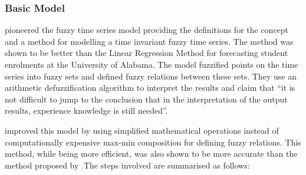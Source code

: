 \documentclass[12pt, oneside, a4paper]{article}
\theoremstyle{definition}
\begin{document}
\subsubsection{Basic Model}
\label{basic}
\cite{song1993forecasting} pioneered the fuzzy time series model providing the definitions for the concept and a method for modelling a time invariant fuzzy time series. The method was shown to be better than the Linear Regression Method for forecasting student enrolments at the University of Alabama. The model fuzzified points on the time series into fuzzy sets and defined fuzzy relations between these sets. They use an arithmetic defuzzification algorithm to interpret the results and claim that ``it is not difficult to jump to the conclusion that in the interpretation of the output results, experience knowledge is still needed''.
 
\cite{chen1996forecasting} improved this model by using simplified mathematical operations instead of computationally expensive max-min composition for defining fuzzy relations. This method, while being more efficient, was also shown to be more accurate than the method proposed by \cite{song1993forecasting}.The steps involved are summarised as follows:
\end{document}
